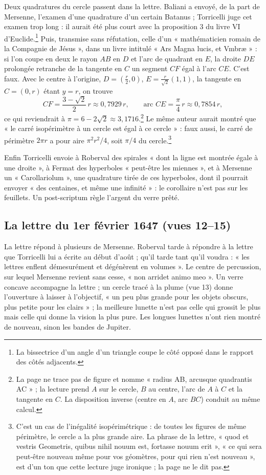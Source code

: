 \documentclass[11pt,a4paper]{article}
\begin{document}
Deux quadratures du cercle passent dans la lettre. Baliani a envoyé, de la part
de Mersenne, l'examen d'une quadrature d'un certain Batanus ; Torricelli juge
cet examen trop long : il aurait été plus court avec la proposition 3 du livre VI
d'Euclide.\footnote{La
bissectrice d'un angle d'un triangle coupe le côté opposé dans le rapport des
côtés adjacents.} Puis, transmise sans réfutation, celle d'un « mathématicien romain de la
Compagnie de Jésus », dans un livre intitulé « Ars Magna lucis, et Vmbræ » : si l'on coupe en
deux le rayon $AB$ en $D$ et l'arc de quadrant en $E$, la droite $DE$ prolongée
retranche de la tangente en $C$ un segment $CF$ égal à l'arc $CE$. C'est faux.
Avec le centre à l'origine, $D=(\tfrac r2,0)$, $E = \frac{r}{\sqrt2}(1,1)$, la
tangente en $C=(0,r)$ étant $y=r$, on trouve
\[
CF = \frac{3-\sqrt2}{2}\,r\approx 0{,}7929\,r,\qquad \text{arc } CE=\frac{\pi}{4}\,r\approx 0{,}7854\,r ,
\]
ce qui reviendrait à $\pi = 6-2\sqrt2\approx 3{,}1716$.\footnote{La page ne trace
pas de figure et nomme « radius AB, arcusque quadrantis AC » ; la lecture prend
$A$ sur le cercle, $B$ au centre, l'arc de $A$ à $C$ et la tangente en $C$. La
disposition inverse (centre en $A$, arc $BC$) conduit au même calcul.} Le même
auteur aurait montré que « le carré isopérimètre à un cercle est égal à ce
cercle » : faux aussi, le carré de périmètre $2\pi r$ a pour aire
$\pi^2r^2/4$, soit $\pi/4$ du cercle.\footnote{C'est un cas de l'inégalité
isopérimétrique : de toutes les figures de même périmètre, le cercle a la plus
grande aire. La phrase de la lettre, « quod et vestris Geometris, quibus nihil
nouum est, fortasse nouum erit », « ce qui sera peut-être nouveau même pour vos
géomètres, pour qui rien n'est nouveau », est d'un ton que cette lecture juge
ironique ; la page ne le dit pas.}

Enfin Torricelli envoie à Roberval des spirales « dont la ligne est montrée égale
à une droite », à Fermat des hyperboles « peut-être les miennes », et à Mersenne
un « Carollariolum », une quadrature tirée de ces hyperboles, dont il pourrait
envoyer « des centaines, et même une infinité » : le corollaire n'est pas sur les
feuillets. Un post-scriptum règle l'argent du verre prêté.

\subsection*{La lettre du 1er février 1647 (vues 12--15)}

La lettre répond à plusieurs de Mersenne. Roberval tarde à répondre à la lettre
que Torricelli lui a écrite au début d'août ; qu'il tarde tant qu'il voudra :
« les lettres enflent démesurément et dégénèrent en volumes ». Le centre de
percussion, sur lequel Mersenne revient sans cesse, « non arridet animo meo ». Un
verre concave accompagne la lettre ; un cercle tracé à la plume (vue 13) donne
l'ouverture à laisser à l'objectif, « un peu plus grande pour les objets
obscurs, plus petite pour les clairs » ; la meilleure lunette n'est pas celle qui
grossit le plus mais celle qui donne la vision la plus pure. Les longues lunettes
n'ont rien montré de nouveau, sinon les bandes de Jupiter.
\end{document}
